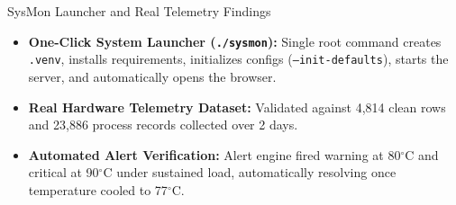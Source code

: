 \begin{frame}{SysMon Launcher and Real Telemetry Findings}
    \begin{itemize}
        \setlength{\itemsep}{10pt}
        \item \textbf{One-Click System Launcher (\texttt{./sysmon}):} Single root command creates \texttt{.venv}, installs requirements, initializes configs (\texttt{--init-defaults}), starts the server, and automatically opens the browser.
        \item \textbf{Real Hardware Telemetry Dataset:} Validated against 4,814 clean rows and 23,886 process records collected over 2 days.
        \item \textbf{Automated Alert Verification:} Alert engine fired warning at 80$^\circ$C and critical at 90$^\circ$C under sustained load, automatically resolving once temperature cooled to 77$^\circ$C.
    \end{itemize}
\end{frame}
